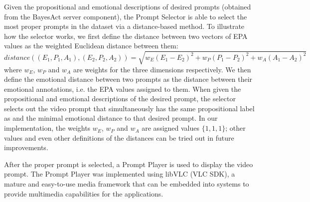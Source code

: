Given the propositional and emotional descriptions of desired prompts (obtained from the BayesAct server component), the Prompt Selector is able to select the most proper prompts in the dataset via a distance-based method. To illustrate how the selector works, we first define the distance between two vectors of EPA values as the weighted Euclidean distance between them:
\begin{equation}
distance((E_1, P_1, A_1), (E_2, P_2, A_2))=\sqrt{w_E(E_1-E_2)^2+w_P(P_1-P_2)^2+w_A(A_1-A_2)^2}
\end{equation}
where $w_E$, $w_P$ and $w_A$ are weights for the three dimensions respectively. We then define the emotional distance between two prompts as the distance between their emotional annotations, i.e. the EPA values assigned to them. When given the propositional and emotional descriptions of the desired prompt, the selector selects out the video prompt that simultaneously has the same propositional label as and the minimal emotional distance to that desired prompt. In our implementation, the weights $w_E$, $w_P$ and $w_A$ are assigned values $\{1, 1, 1\}$; other values and even other definitions of the distances can be tried out in future improvements.

After the proper prompt is selected, a Prompt Player is used to display the video prompt. The Prompt Player was implemented using libVLC (VLC SDK), a mature and easy-to-use media framework that can be embedded into systems to provide multimedia capabilities for the applications.



